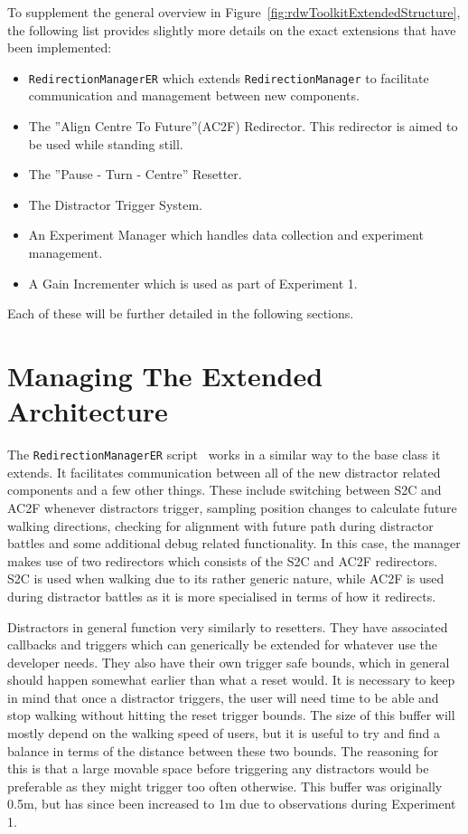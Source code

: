 To supplement the general overview in Figure~\ref{fig:rdwToolkitExtendedStructure}, the following list provides slightly more details on the exact extensions that have been implemented:
\begin{itemize}
    \item \lstinline{RedirectionManagerER} which extends \lstinline{RedirectionManager} to facilitate communication and management between new components.
    \item The ''Align Centre To Future''(AC2F) Redirector. This redirector is aimed to be used while standing still.
    \item The ''Pause - Turn - Centre'' Resetter.
    \item The Distractor Trigger System.
    \item An Experiment Manager which handles data collection and experiment management.
    \item A Gain Incrementer which is used as part of Experiment 1.
\end{itemize}

Each of these will be further detailed in the following sections. 

\section{Managing The Extended Architecture}
The \lstinline{RedirectionManagerER} script~\cite{redirectionManagerER} works in a similar way to the base class it extends. It facilitates communication between all of the new distractor related components and a few other things. These include switching between S2C and AC2F whenever distractors trigger, sampling position changes to calculate future walking directions, checking for alignment with future path during distractor battles and some additional debug related functionality. In this case, the manager makes use of two redirectors which consists of the S2C and AC2F redirectors. S2C is used when walking due to its rather generic nature, while AC2F is used during distractor battles as it is more specialised in terms of how it redirects.

Distractors in general function very similarly to resetters. They have associated callbacks and triggers which can generically be extended for whatever use the developer needs. They also have their own trigger safe bounds, which in general should happen somewhat earlier than what a reset would. It is necessary to keep in mind that once a distractor triggers, the user will need time to be able and stop walking without hitting the reset trigger bounds. The size of this buffer will mostly depend on the walking speed of users, but it is useful to try and find a balance in terms of the distance between these two bounds. The reasoning for this is that a large movable space before triggering any distractors would be preferable as they might trigger too often otherwise. This buffer was originally 0.5m, but has since been increased to 1m due to observations during Experiment 1.

